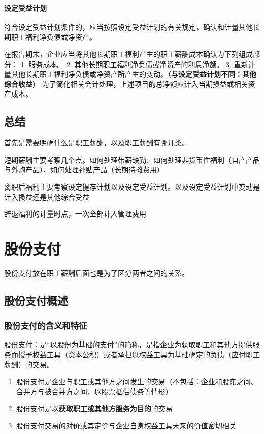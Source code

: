 \documentclass[UTF8,12pt]{ctexart}
\numberwithin{equation}{section} %
\numberwithin{figure}{section}
\numberwithin{table}{section}
\begin{document}
	\paragraph{设定受益计划}
	符合设定受益计划条件的，应当按照设定受益计划的有关规定，确认和计量其他长期职工福利净负债或净资产。
	
	在报告期末，企业应当将其他长期职工福利产生的职工薪酬成本确认为下列组成部分：
	1.	服务成本。
	2.	其他长期职工福利净负债或净资产的利息净额。
	3.	重新计量其他长期职工福利净负债或净资产所产生的变动。（\textbf{与设定受益计划不同：其他综合收益}）
	为了简化相关会计处理，上述项目的总净额应计入当期损益或相关资产成本。
	
	\subsection{总结}
	
	首先是需要明确什么是职工薪酬，以及职工薪酬有哪几类。
	
	短期薪酬主要考察几个点。如何处理带薪缺勤、如何处理非货币性福利（自产产品与外购产品）、如何处理补贴产品（长期待摊费用）
	
	离职后福利主要考察设定提存计划以及设定受益计划。以及设定受益计划中变动是计入损益还是其他综合受益
	
	辞退福利的计量时点，一次全部计入管理费用
	
	
	
	
	\newpage
	\section{股份支付}
	股份支付放在职工薪酬后面也是为了区分两者之间的关系。
	\subsection{股份支付概述}
	
	\subsubsection{股份支付的含义和特征}
	股份支付：是“以股份为基础的支付”的简称，是指企业为获取职工和其他方提供服务而授予权益工具（资本公积）或者承担以权益工具为基础确定的负债（应付职工薪酬）的交易。
	
	\begin{enumerate}
		\item 股份支付是企业与职工或其他方之间发生的交易（不包括：企业和股东之间、合并方与被合并方之间、以股票抵偿债务等情形）
		
		\item 股份支付是以\textbf{获取职工或其他方服务为目的}的交易
		
		\item 股份支付交易的对价或其定价与企业自身权益工具未来的价值密切相关
	\end{enumerate}
	
\end{document}

